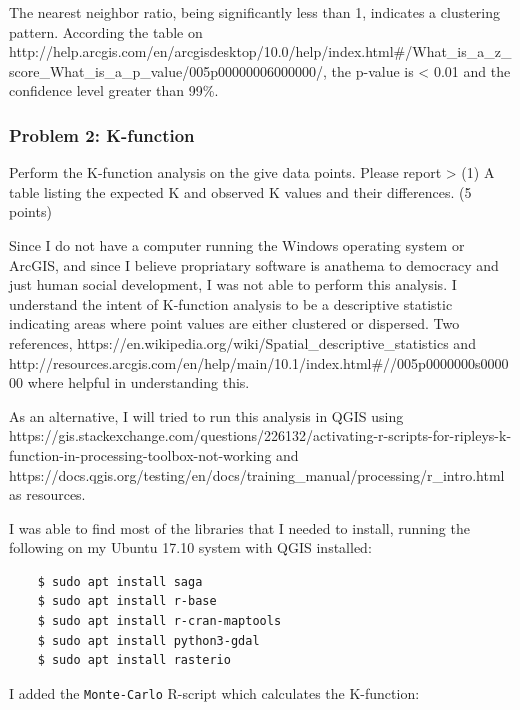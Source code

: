 \documentclass[11pt]{article}
\begin{document}
    The nearest neighbor ratio, being significantly less than 1, indicates a
clustering pattern. According the table on
http://help.arcgis.com/en/arcgisdesktop/10.0/help/index.html\#/What\_is\_a\_z\_score\_What\_is\_a\_p\_value/005p00000006000000/,
the p-value is \textless{} 0.01 and the confidence level greater than
99\%.

\vskip 0.2in


    \hypertarget{problem-2-k-function}{%
\subsubsection{Problem 2: K-function}\label{problem-2-k-function}}

Perform the K-function analysis on the give data points. Please report
\textgreater{} (1) A table listing the expected K and observed K values
and their differences. (5 points)

\vskip 0.2in


    Since I do not have a computer running the Windows operating system or
ArcGIS, and since I believe propriatary software is anathema to
democracy and just human social development, I was not able to perform
this analysis. I understand the intent of K-function analysis to be a
descriptive statistic indicating areas where point values are either
clustered or dispersed. Two references,
https://en.wikipedia.org/wiki/Spatial\_descriptive\_statistics and
http://resources.arcgis.com/en/help/main/10.1/index.html\#//005p0000000s000000
where helpful in understanding this.

As an alternative, I will tried to run this analysis in QGIS using
https://gis.stackexchange.com/questions/226132/activating-r-scripts-for-ripleys-k-function-in-processing-toolbox-not-working
and
https://docs.qgis.org/testing/en/docs/training\_manual/processing/r\_intro.html
as resources.

I was able to find most of the libraries that I needed to install,
running the following on my Ubuntu 17.10 system with QGIS installed:

\begin{verbatim}
    $ sudo apt install saga
    $ sudo apt install r-base
    $ sudo apt install r-cran-maptools
    $ sudo apt install python3-gdal
    $ sudo apt install rasterio
\end{verbatim}

I added the \texttt{Monte-Carlo} R-script which calculates the
K-function:
\end{document}
